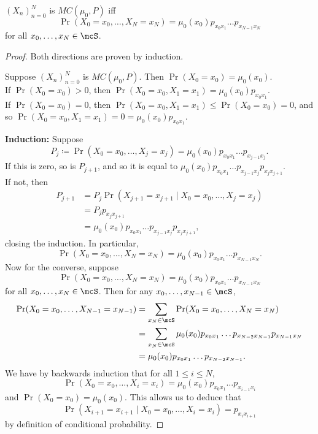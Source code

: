 \begin{theorem*} \label{thm:crit}
    $(X_n)_{n=0}^N$ is $MC(\mu_0, P)$ iff \[
        \Pr(X_0 = x_0, \dots, X_N = x_N)
            = \mu_0(x_0) p_{x_0 x_1} \dots p_{x_{N-1} x_N}
    \] for all $x_0, \dots, x_N \in \mcS$.
\end{theorem*}
\begin{proof}
    Both directions are proven by induction.

    Suppose $(X_n)_{n=0}^N$ is $MC(\mu_0, P)$.
    Then $\Pr(X_0 = x_0) = \mu_0(x_0)$. \\
    If $\Pr(X_0 = x_0) > 0$, then
    $\Pr(X_0 = x_0, X_1 = x_1) = \mu_0(x_0) p_{x_0 x_1}$. \\
    If $\Pr(X_0 = x_0) = 0$, then
    $\Pr(X_0 = x_0, X_1 = x_1) \le \Pr(X_0 = x_0) = 0$,
    and so $\Pr(X_0 = x_0, X_1 = x_1) = 0 = \mu_0(x_0) p_{x_0 x_1}$.

    \textbf{Induction:} Suppose \[
        P_j \coloneq \Pr(X_0 = x_0, \dots, X_j = x_j)
        = \mu_0(x_0) p_{x_0 x_1} \dots p_{x_{j-1} x_j}.
    \] If this is zero, so is $P_{j+1}$, and so it is equal to
    $\mu_0(x_0) p_{x_0 x_1} \dots p_{x_{j-1} x_j} p_{x_j x_{j+1}}$. \\
    If not, then \begin{align*}
        P_{j+1}
            &= P_j\Pr(X_{j+1} = x_{j+1} \mid X_0 = x_0, \dots, X_j = x_j) \\
            &= P_j p_{x_j x_{j+1}} \\
            &= \mu_0(x_0) p_{x_0 x_1} \dots p_{x_{j-1} x_j} p_{x_j x_{j+1}},
    \end{align*} closing the induction.
    In particular, \[
        \Pr(X_0 = x_0, \dots, X_N = x_N) = \mu_0(x_0) p_{x_0 x_1} \dots
        p_{x_{N-1} x_N}.
    \] Now for the converse, suppose \[
        \Pr(X_0 = x_0, \dots, X_N = x_N)
        = \mu_0(x_0) p_{x_0 x_1} \dots p_{x_{N-1} x_N}
    \] for all $x_0, \dots, x_N \in \mcS$.
    Then for any $x_0, \dots, x_{N-1} \in \mcS$,
    \begin{align*}
        \Pr(X_0 = x_0, \dots, X_{N-1} = x_{N-1})
            &= \sum_{x_N \in \mcS} \Pr(X_0 = x_0, \dots, X_N = x_N) \\
            &= \sum_{x_N \in \mcS} \mu_0(x_0) p_{x_0 x_1} \dots 
                p_{x_{N-2} x_{N-1}} p_{x_{N-1} x_N} \\
            &= \mu_0(x_0) p_{x_0 x_1} \dots p_{x_{N-2} x_{N-1}}.
    \end{align*}
    We have by backwards induction that for all $1 \le i \le N$, \[
        \Pr(X_0 = x_0, \dots, X_i = x_i)
        = \mu_0(x_0) p_{x_0 x_1} \dots p_{x_{i-1} x_i}
    \] and $\Pr(X_0 = x_0) = \mu_0(x_0)$.
    This allows us to deduce that \[
        \Pr(X_{i+1} = x_{i+1} \mid X_0 = x_0, \dots, X_i = x_i)
        = p_{x_i x_{i+1}}
    \] by definition of conditional probability.
\end{proof}

